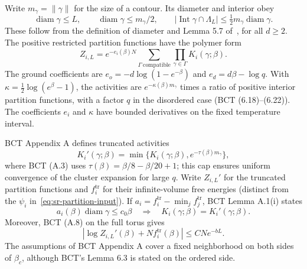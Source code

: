Write $m_\gamma=\|\gamma\|$ for the size of a contour. Its diameter
and interior obey
\begin{equation}
 \operatorname{diam}\gamma\le L,\qquad
 \operatorname{diam}\gamma\le m_\gamma/2,\qquad
 |\operatorname{Int}\gamma\cap\Lambda_L|
       \le\tfrac12m_\gamma\operatorname{diam}\gamma.
 \label{eq:sr-contour-geometry}
\end{equation}
These follow from the definition of diameter and Lemma 5.7
of~\cite{BorgsChayesTetali2012}, for all $d\ge2$.
The positive restricted partition functions have the polymer form
\begin{equation}
 Z_{i,L}=e^{-e_i(\beta)N}
       \sum_{\Gamma\ \mathrm{compatible}}
       \prod_{\gamma\in\Gamma}K_i(\gamma;\beta).
 \label{eq:sr-polymer-form}
\end{equation}
The ground coefficients are $e_o=-d\log(1-e^{-\beta})$ and
$e_d=d\beta-\log q$. With $\kappa=\tfrac12\log(e^\beta-1)$, the
activities are $e^{-\kappa(\beta)m_\gamma}$ times a ratio of positive
interior partition functions, with a factor $q$ in the disordered case
(BCT (6.18)--(6.22)). The coefficients $e_i$ and $\kappa$ have bounded
derivatives on the fixed temperature interval.

BCT Appendix A defines truncated activities
\begin{equation}
 K_i'(\gamma;\beta)=\min\{K_i(\gamma;\beta),
                                  e^{-\tau(\beta)m_\gamma}\},
 \label{eq:sr-truncation}
\end{equation}
where BCT (A.3) uses $\tau(\beta)=\beta/8-\beta/20+1$; this cap
ensures uniform convergence of the cluster expansion for large $q$.
Write $Z_{i,L}'$ for the truncated partition functions and
$f_i^{\mathrm{tr}}$ for their infinite-volume free energies (distinct
from the $\psi_i$ in~\eqref{eq:sr-partition-input}). If
$a_i=f_i^{\mathrm{tr}}-\min_j f_j^{\mathrm{tr}}$, BCT Lemma A.1(i) states
\begin{equation}
 a_i(\beta)\operatorname{diam}\gamma\le c_0\beta
 \quad\Longrightarrow\quad K_i(\gamma;\beta)=K_i'(\gamma;\beta).
 \label{eq:sr-inactive-cutoff-input}
\end{equation}
Moreover, BCT (A.8) on the full torus gives
\begin{equation}
 |\log Z_{i,L}'(\beta)+Nf_i^{\mathrm{tr}}(\beta)|
       \le CNe^{-bL}.
 \label{eq:sr-truncated-volume-input}
\end{equation}
The assumptions of BCT Appendix A cover a fixed neighborhood on both
sides of $\beta_c$, although BCT's Lemma 6.3 is stated on the ordered
side.

